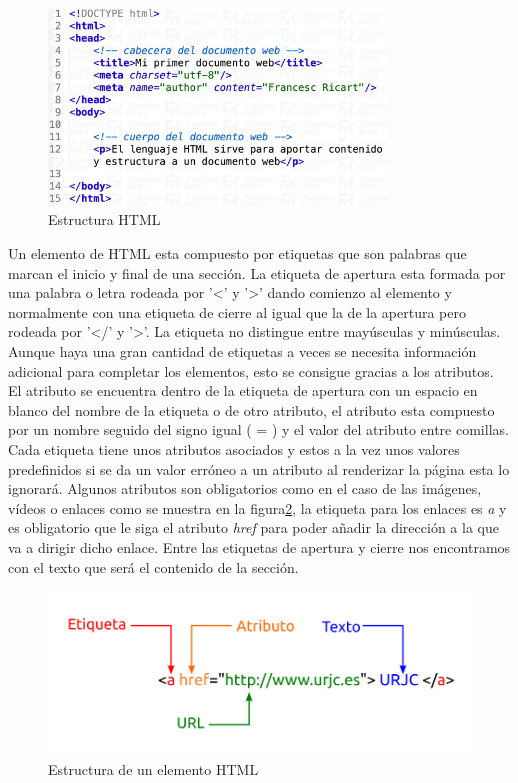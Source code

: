 \begin{figure}[H]
    \centering
    \includegraphics[width=9cm, keepaspectratio]{img/html.jpg}
    \caption{Estructura HTML}
    \label{fig:html}
\end{figure}

Un elemento de HTML esta compuesto por etiquetas que son palabras que marcan el inicio y final de una sección. La etiqueta de apertura esta formada por una palabra o letra rodeada por '\textless' y '\textgreater' dando comienzo al elemento y normalmente con una etiqueta de cierre al igual que la de la apertura pero rodeada por '\textless/' y '\textgreater'. La etiqueta no distingue entre mayúsculas y minúsculas. Aunque haya una gran cantidad de etiquetas a veces se necesita información adicional para completar los elementos, esto se consigue gracias a los atributos.\\ 

El atributo se encuentra dentro de la etiqueta de apertura con un espacio en blanco del nombre de la etiqueta o de otro atributo, el atributo esta compuesto por un nombre seguido del signo igual ( = ) y el valor del atributo entre comillas. \\

Cada etiqueta tiene unos atributos asociados y estos a la vez unos valores predefinidos si se da un valor erróneo a un atributo al renderizar la página esta lo ignorará. Algunos atributos son obligatorios como en el caso de las imágenes, vídeos o enlaces como se muestra en la figura\ref{fig:elemento}, la etiqueta para los enlaces es \textit{a} y es obligatorio que le siga el atributo \textit{href}  para poder añadir la dirección a la que va a dirigir dicho enlace. Entre las etiquetas de apertura y cierre nos encontramos con el texto que será el contenido de la sección.\cite{etiqueta}


\begin{figure}[H]
    \centering
    \includegraphics[width=12cm, keepaspectratio]{img/elemento.png}
    \caption{Estructura de un elemento HTML}
    \label{fig:elemento}
\end{figure}

